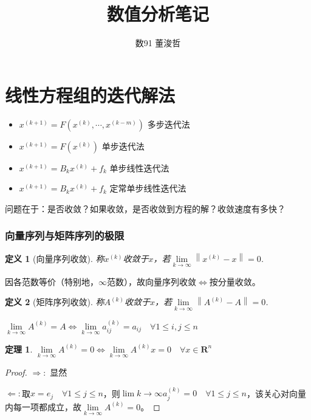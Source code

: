 \documentclass{ctexart}
\title{数值分析笔记}
\author{数91 董浚哲}
\begin{document}
\maketitle
\newcommand{\R}{\mathbf{R}}
\newcommand{\dd}{\,\mathrm{d}}
\newcommand{\st}{\text{ s.t. }}
\newcommand{\pp}[2]{\frac{\partial #1}{\partial #2}}
\newcommand{\fl}{\mathrm{fl}}
\newcommand{\nm}[1]{\left\|#1 \right\|}
\newcommand{\dif}[2]{\frac{\mathrm{d}#1}{\mathrm{d}#2}}

\newtheorem{Thm}{定理}[section]
\newtheorem{Lemma}[Thm]{引理}
\newtheorem{Prop}[Thm]{命题}
\newtheorem{Cor}[Thm]{推论}
\newtheorem{Def}{定义}[section]
\newtheorem{Rmk}{注}[section]
\newtheorem{Eg}{例}[section]
\newenvironment{solution}{\begin{proof}[Solution]}{\end{proof}}

\section{线性方程组的迭代解法}
\begin{itemize}
\item $x^{(k+1)}=F(x^{(k)},\cdots, x^{(k-m)})$ 多步迭代法
\item $x^{(k+1)}=F(x^{(k)})$ 单步迭代法
\item $x^{(k+1)}=B_kx^{(k)}+f_k$ 单步线性迭代法
\item $x^{(k+1)}=B_kx^{(k)}+f_k$ 定常单步线性迭代法
\end{itemize}
问题在于：是否收敛？如果收敛，是否收敛到方程的解？收敛速度有多快？

\subsubsection{向量序列与矩阵序列的极限}
\begin{Def}[向量序列收敛]
称$x^{(k)}$收敛于$x$，若$\lim\limits_{k\to\infty}\nm{x^{(k)}-x}=0$.
\end{Def}
因各范数等价（特别地，$\infty$范数），故向量序列收敛$\Leftrightarrow$按分量收敛。

\begin{Def}[矩阵序列收敛]
称$A^{(k)}$收敛于$x$，若$\lim\limits_{k\to\infty}\nm{A^{(k)}-A}=0$.
\end{Def}
$\lim\limits_{k\to\infty}A^{(k)}=A\Leftrightarrow \lim\limits_{k\to\infty}a^{(k)}_{ij}=a_{ij}\quad\forall 1\leq i,j\leq n$

\begin{Thm}
$\lim\limits_{k\to\infty}A^{(k)}=0\Leftrightarrow \lim\limits_{k\to\infty}A^{(k)}x=0\quad\forall x\in \R^n$
\end{Thm}
\begin{proof}
$\bm{\Rightarrow}:$ 显然

$\bm{\Leftarrow}:$取$x=e_j\quad \forall 1\leq j\leq n$，则$\lim\limits{k\to\infty}a^{(k)}_j=0\quad\forall 1\leq j\leq n$，该关心对向量内每一项都成立，故$\lim\limits_{k\to\infty}A^{(k)}=0$。
\end{proof}
\end{document}
